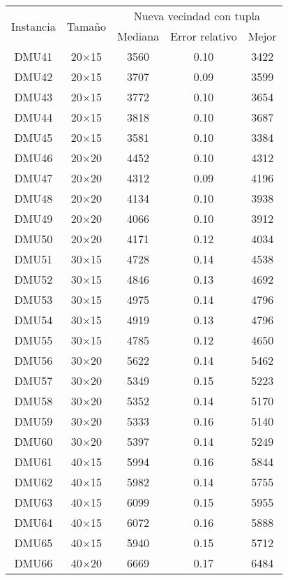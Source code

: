 \begin{table}[H]
\centering
\begin{tabular}{@{}ccccc@{}}
\toprule
\multirow{2}{*}{Instancia} & \multirow{2}{*}{Tamaño} & \multicolumn{3}{c}{Nueva vecindad con tupla} \\ \cmidrule(lr){3-5}
& & Mediana& Error relativo & Mejor  \\ \midrule
DMU41 & 20$\times$15 & 3560 & 0.10 & 3422\\ 
DMU42 & 20$\times$15 & 3707 & 0.09 & 3599\\ 
DMU43 & 20$\times$15 & 3772 & 0.10 & 3654\\ 
DMU44 & 20$\times$15 & 3818 & 0.10 & 3687\\ 
DMU45 & 20$\times$15 & 3581 & 0.10 & 3384\\ 
DMU46 & 20$\times$20 & 4452 & 0.10 & 4312\\ 
DMU47 & 20$\times$20 & 4312 & 0.09 & 4196\\ 
DMU48 & 20$\times$20 & 4134 & 0.10 & 3938\\ 
DMU49 & 20$\times$20 & 4066 & 0.10 & 3912\\ 
DMU50 & 20$\times$20 & 4171 & 0.12 & 4034\\ 
DMU51 & 30$\times$15 & 4728 & 0.14 & 4538\\ 
DMU52 & 30$\times$15 & 4846 & 0.13 & 4692\\ 
DMU53 & 30$\times$15 & 4975 & 0.14 & 4796\\ 
DMU54 & 30$\times$15 & 4919 & 0.13 & 4796\\ 
DMU55 & 30$\times$15 & 4785 & 0.12 & 4650\\ 
DMU56 & 30$\times$20 & 5622 & 0.14 & 5462\\ 
DMU57 & 30$\times$20 & 5349 & 0.15 & 5223\\ 
DMU58 & 30$\times$20 & 5352 & 0.14 & 5170\\ 
DMU59 & 30$\times$20 & 5333 & 0.16 & 5140\\ 
DMU60 & 30$\times$20 & 5397 & 0.14 & 5249\\ 
DMU61 & 40$\times$15 & 5994 & 0.16 & 5844\\ 
DMU62 & 40$\times$15 & 5982 & 0.14 & 5755\\ 
DMU63 & 40$\times$15 & 6099 & 0.15 & 5955\\ 
DMU64 & 40$\times$15 & 6072 & 0.16 & 5888\\ 
DMU65 & 40$\times$15 & 5940 & 0.15 & 5712\\ 
DMU66 & 40$\times$20 & 6669 & 0.17 & 6484\\ 

\end{tabular}
\end{table}
